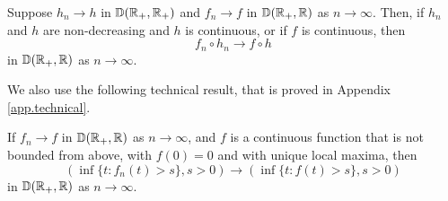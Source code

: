 \begin{lemma}\label{lemma.technicalcomposedfunctions}
Suppose $h_n\to h$ in ${\mathbb D}({\mathbb R}_+,{\mathbb R}_+)$ and $f_n\to f$ in ${\mathbb D}({\mathbb R}_+,{\mathbb R})$ as $n\to\infty$. Then, if $h_n$ and $h$ are non-decreasing and $h$ is continuous, or if $f$ is continuous, then 
$$f_n\circ h_n \to f\circ h$$
in ${\mathbb D}({\mathbb R}_+,{\mathbb R})$ as $n\to\infty$.
\end{lemma}

We also use the following technical result, that is proved in Appendix \ref{app.technical}.

\begin{lemma}\label{lem.technicalhittingtimes}
If $f_n\to f$ in ${\mathbb D}({\mathbb R}_+,{\mathbb R})$ as $n\to\infty$, and $f$ is a continuous function that is not bounded from above, with $f(0)=0$ and  with unique local maxima, then 
$$\left(\inf\{t:f_n(t)>s\},s>0\right)\to \left(\inf\{t:f(t)>s\},s>0\right)$$
in ${\mathbb D}({\mathbb R}_+,{\mathbb R})$ as $n\to\infty$.
\end{lemma}


